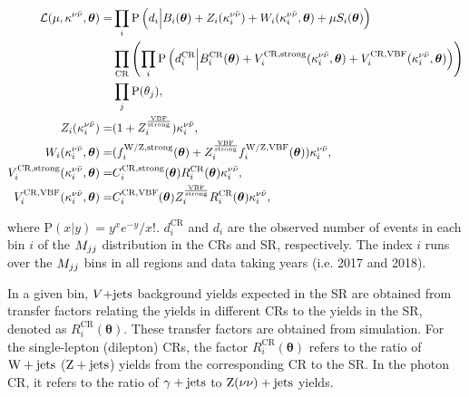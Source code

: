\begin{equation}
  \label{eq:fit_likelihood_func}
  \begin{aligned}
  \mathcal{L} (\mu,\kappa^{\nu\bar{\nu}}, \boldsymbol{\theta}) = & \prod_{i} \mathrm{P}\left(d_{i} \Big{|} B_{i}(\boldsymbol{\theta}) + Z_{i}(\kappa_{i}^{\nu\bar{\nu}})+W_{i}(\kappa_{i}^{\nu\bar{\nu}},\boldsymbol{\theta}) + \mu S_{i}(\boldsymbol{\theta})\right) \\
  & \prod_{\mathrm{CR}} \left( \prod_{i} \mathrm{P} \left(d^{\mathrm{CR}}_{i} \Big{|} B^{\mathrm{CR}}_{i}(\boldsymbol{\theta}) + V_{i}^{\mathrm{CR,strong}}(\kappa_{i}^{\nu\bar{\nu}},\boldsymbol{\theta}) + V_{i}^{\mathrm{CR,VBF}}(\kappa_{i}^{\nu\bar{\nu}},\boldsymbol{\theta}) \right)\right) \\
   & \prod_{j} \mathrm{P}(\theta_{j}), \\
  Z_{i}(\kappa_{i}^{\nu\bar{\nu}}) = & (1+Z^{\frac{\mathrm{VBF}}{\mathrm{strong}}}_{i}) \kappa_{i}^{\nu\bar{\nu}}, \\
  W_{i}(\kappa_{i}^{\nu\bar{\nu}},\boldsymbol{\theta}) = & (f^{\mathrm{W/Z,strong}}_{i}(\boldsymbol{\theta}) + Z^{\frac{\mathrm{VBF}}{\mathrm{strong}}}_{i} f^{\mathrm{W/Z,VBF}}_{i}(\boldsymbol{\theta})) \kappa_{i}^{\nu\bar{\nu}}, \\
  V_{i}^{\mathrm{CR,strong}}(\kappa_{i}^{\nu\bar{\nu}},\boldsymbol{\theta}) = & C^{\mathrm{CR,strong}}_{i}(\boldsymbol{\theta}) R^{\mathrm{CR}}_{i}(\boldsymbol{\theta}) \kappa_{i}^{\nu\bar{\nu}}, \\
  V_{i}^{\mathrm{CR,VBF}}(\kappa_{i}^{\nu\bar{\nu}},\boldsymbol{\theta}) = &C^{\mathrm{CR,VBF}}_{i}(\boldsymbol{\theta}) Z^{\frac{\mathrm{VBF}}{\mathrm{strong}}}_{i} R^{\mathrm{CR}}_{i}(\boldsymbol{\theta}) \kappa_{i}^{\nu\bar{\nu}}, \\
  \end{aligned}
\end{equation}

where ${\mathrm{P}(x|y) = y^{x}e^{-y}/x!}$. $d^{\mathrm{CR}}_{i}$
and $d_{i}$ are the observed number of events in each bin $i$ of
the $M_{jj}$ distribution in the CRs and SR, respectively. The index $i$ runs
over the $M_{jj}$ bins in all regions and data taking years (i.e. 2017 and 2018).

In a given bin, $V\text{+jets}$ background yields expected in the SR are
obtained from transfer factors relating the yields in different
CRs to the yields in the SR, denoted as
$R^{\mathrm{CR}}_{i}(\boldsymbol{\theta})$. These transfer factors are 
obtained from simulation. For the single-lepton (dilepton) CRs, the factor
$R^{\mathrm{CR}}_{i}(\boldsymbol{\theta})$ refers to the ratio
of $\mathrm{W}+\textrm{jets}$ ($\mathrm{Z}+\textrm{jets}$) yields from the corresponding CR to the SR. In the
photon CR, it refers to the ratio of $\gamma+\textrm{jets}$ to $\mathrm{Z}(\nu\nu)+\textrm{jets}$ yields.

